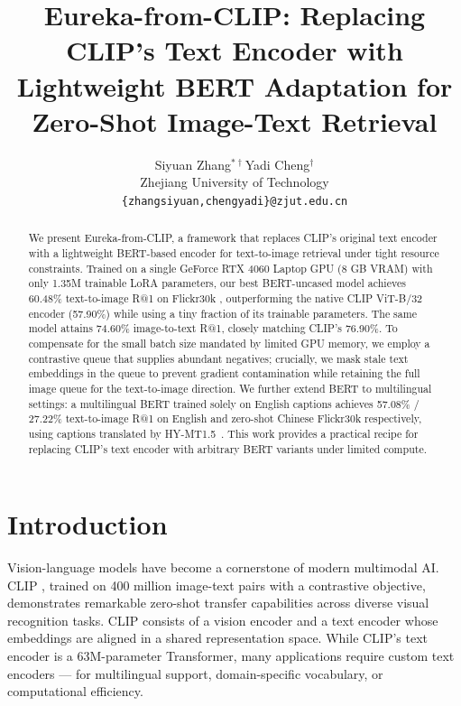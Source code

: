 \documentclass[10pt,leqno]{amsart}
\begin{document}
\title{Eureka-from-CLIP: Replacing CLIP's Text Encoder with Lightweight BERT Adaptation for Zero-Shot Image-Text Retrieval}

\author{Siyuan Zhang$^{*\dagger}$\quad Yadi Cheng$^{\dagger}$\\[4pt]
  \small Zhejiang University of Technology\\
  \small\texttt{\{zhangsiyuan,chengyadi\}@zjut.edu.cn}}


\maketitle

\let\thefootnote\relax
{}

\begin{abstract}
We present Eureka-from-CLIP, a framework that replaces CLIP's original text encoder with a lightweight BERT-based encoder for text-to-image retrieval under tight resource constraints. Trained on a single GeForce RTX 4060 Laptop GPU (8 GB VRAM) with only 1.35M trainable LoRA \citep{hu2022lora} parameters, our best BERT-uncased model achieves 60.48\% text-to-image R@1 on Flickr30k \citep{plummer2015flickr30k}, outperforming the native CLIP ViT-B/32 encoder (57.90\%) while using a tiny fraction of its trainable parameters. The same model attains 74.60\% image-to-text R@1, closely matching CLIP's 76.90\%. To compensate for the small batch size mandated by limited GPU memory, we employ a contrastive queue that supplies abundant negatives; crucially, we mask stale text embeddings in the queue to prevent gradient contamination while retaining the full image queue for the text-to-image direction. We further extend BERT to multilingual settings: a multilingual BERT trained solely on English captions achieves 57.08\% / 27.22\% text-to-image R@1 on English and zero-shot Chinese Flickr30k respectively, using captions translated by HY-MT1.5~\citep{hymt152025tencent}. This work provides a practical recipe for replacing CLIP's text encoder with arbitrary BERT variants under limited compute.
\end{abstract}

\bigskip

\section{Introduction}

Vision-language models have become a cornerstone of modern multimodal AI. CLIP \citep{radford2021clip}, trained on 400 million image-text pairs with a contrastive objective, demonstrates remarkable zero-shot transfer capabilities across diverse visual recognition tasks. CLIP consists of a vision encoder and a text encoder whose embeddings are aligned in a shared representation space. While CLIP's text encoder is a 63M-parameter Transformer, many applications require custom text encoders --- for multilingual support, domain-specific vocabulary, or computational efficiency.
\end{document}
